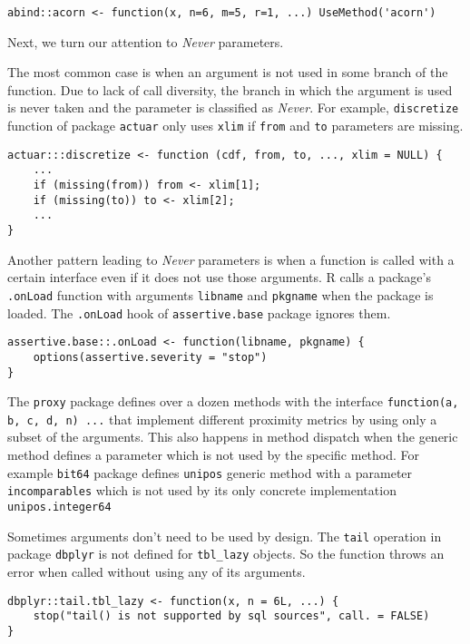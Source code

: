 \documentclass[review,nonacm,screen,acmsmall,anonymous=true]{acmart}
\newcommand{\never}{\emph{Never}\xspace}
\newcommand{\code}[1]{\lstinline[style=R]|#1|\xspace}
\begin{document}
\begin{lstlisting}
abind::acorn <- function(x, n=6, m=5, r=1, ...) UseMethod('acorn')
\end{lstlisting}


Next, we turn our attention to \never parameters.

The most common case is when an argument is not used in some branch of the
function. Due to lack of call diversity, the branch in which the argument is
used is never taken and the parameter is classified as \never. For example,
\code{discretize} function of package \code{actuar} only uses \code{xlim} if
\code{from} and \code{to} parameters are missing.
\begin{lstlisting}
actuar:::discretize <- function (cdf, from, to, ..., xlim = NULL) {
    ...
    if (missing(from)) from <- xlim[1];
    if (missing(to)) to <- xlim[2];
    ...
}
\end{lstlisting}


Another pattern leading to \never parameters is when a function is called with a
certain interface even if it does not use those arguments. R calls a package's
\code{.onLoad} function with arguments \code{libname} and \code{pkgname} when
the package is loaded. The \code{.onLoad} hook of \code{assertive.base} package
ignores them.
\begin{lstlisting}
assertive.base::.onLoad <- function(libname, pkgname) {
    options(assertive.severity = "stop")
}
\end{lstlisting}

The \code{proxy} package defines over a dozen methods with the interface
\code{function(a, b, c, d, n) ...} that implement different proximity metrics by
using only a subset of the arguments.
This also happens in method dispatch when the generic method defines a parameter
which is not used by the specific method. For example \code{bit64} package
defines \code{unipos} generic method with a parameter \code{incomparables} which
is not used by its only concrete implementation \code{unipos.integer64}


Sometimes arguments don't need to be used by design.
The \code{tail} operation in package \code{dbplyr} is not defined for
\code{tbl_lazy} objects. So the function throws an error when called without
using any of its arguments.
\begin{lstlisting}
dbplyr::tail.tbl_lazy <- function(x, n = 6L, ...) {
    stop("tail() is not supported by sql sources", call. = FALSE)
}
\end{lstlisting}
\end{document}
